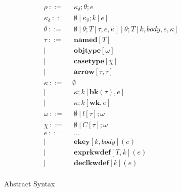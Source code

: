 \begin{figure*}
\begin{align*}
      \rho              ~::=&~ \kappa_{\delta};\theta;e\\
      \kappa_{\delta}   ~::=&~ \emptyset ~ | ~ \kappa_{\delta};k[e]\\
      \theta                  ~::=&~ \emptyset ~ | ~ \theta; T[\tau, e, \kappa] ~ | ~ \theta; T[k, body, e, \kappa]\\
      \tau              ~::=&~ \mathbf{named}[T]\\
                              |~    & ~ \mathbf{objtype}[\omega]\\
                              |~    & ~ \mathbf{casetype}[\chi]\\
                              |~  & ~ \mathbf{arrow}[\tau, \tau]\\
      \kappa                  ~::=& \emptyset\\       
                              |~  & ~ \kappa;k[\mathbf{bk}(\tau),e]\\
                              |~  & ~ \kappa;k[\mathbf{wk},e]\\
      \omega                  ~::=&~ \emptyset ~|~ l[\tau];\omega\\
      \chi              ~::=& ~\emptyset ~ | ~C[\tau];\omega\\
      e                       ~::=&~ ...\\
                              | ~ &~ \mathbf{ekey}[k,body](e)\\
                              | ~ &~ \mathbf{exprkwdef}[T,k](e)\\
                              | ~ &~ \mathbf{declkwdef}[k](e)\\
\end{align*}
\caption{Abstract Syntax}
\label{formal-syntax}
\end{figure*}